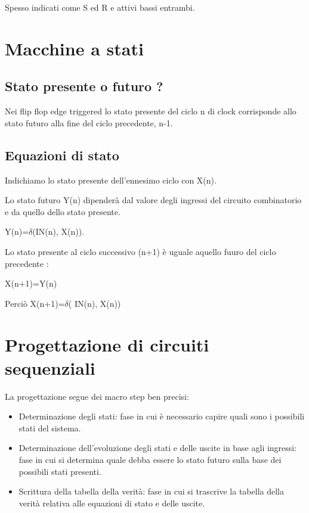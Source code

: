 \documentclass[a4paper]{book}
\begin{document}
Spesso indicati come S ed R e attivi bassi entrambi.


\section{Macchine a stati}

\subsection{Stato presente o futuro ?}
Nei flip flop edge triggered lo stato presente del ciclo n di clock corrisponde allo stato futuro alla fine del ciclo precedente, n-1.


\subsection{Equazioni di stato}

Indichiamo lo stato presente dell'ennesimo ciclo con X(n).

Lo stato futuro Y(n) dipenderà dal valore degli ingressi del circuito combinatorio e da quello dello stato presente.

Y(n)=\(\delta\)(IN(n), X(n)).

Lo stato presente al ciclo successivo (n+1) è uguale aquello fuuro del ciclo precedente :

X(n+1)=Y(n)

Perciò X(n+1)=\(\delta\)( IN(n), X(n))


\section{Progettazione di circuiti sequenziali}

La progettazione segue dei macro step ben precisi:

\begin{itemize}
\item{Determinazione degli stati}: fase in cui è necessario capire quali sono i possibili stati del sistema.
\item{Determinazione dell'evoluzione degli stati e delle uscite in base agli ingressi}: fase in cui si determina quale debba essere lo stato futuro sulla base dei possibili stati presenti.
\item{Scrittura della tabella della verità}: fase in cui si trascrive la tabella della verità relativa alle equazioni di stato e delle uscite.
\end{itemize}
\end{document}
